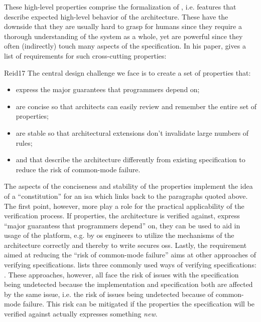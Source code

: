 These high-level properties comprise the formalization of , i.e. features that describe expected high-level behavior of the architecture.
These have the downside that they are usually hard to grasp for humans since they require a thorough understanding of the system as a whole, yet are powerful since they often (indirectly) touch many aspects of the specification.
In his paper, \citeauthor{Reid17} gives a list of requirements for such cross-cutting properties:
\begin{displaycquote}[pp.88:2-3]{Reid17}
    The central design challenge we face is to create a set of properties that:
    \begin{itemize}
        \item express the major guarantees that programmers depend on;
        \item are concise so that architects can easily review and remember the entire set of properties;
        \item are stable so that architectural extensions don't invalidate large numbers of rules;
        \item and that describe the architecture differently from existing specification to reduce the risk of common-mode failure.
    \end{itemize}
\end{displaycquote}

The aspects of the conciseness and stability of the properties implement the idea of a \enquote{constitution} for an \gls{isa} which links back to the paragraphs quoted above.
The first point, however, more play a role for the practical applicability of the verification process.
If properties, the architecture is verified against, express \enquote{major guarantess that programmers  depend} on, they can be used to aid in usage of the platform, e.g. by \gls{os} engineers to utilize the mechanisms of the architecture correctly and thereby to write secures \glspl{os}.
Lastly, the requirement aimed at reducing the \enquote{risk of common-mode failure} aims at other approaches of verifying specifications.
\citeauthor{Reid17} lists three commonly used ways of verifying specifications: .
These approaches, however, all face the risk of issues with the specification being undetected because the implementation and specification both are affected by the same issue, i.e. the risk of issues being undetected because of common-mode failure.
This risk can be mitigated if the properties the specification will be verified against actually expresses something \textit{new}.

